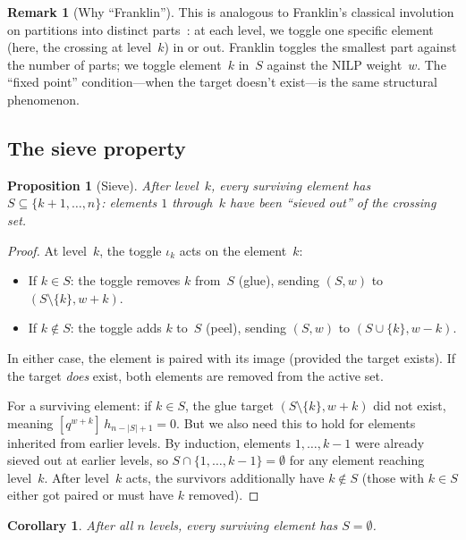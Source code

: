 \documentclass[11pt]{article}
\theoremstyle{plain}
\newtheorem{proposition}[theorem]{Proposition}
\newtheorem{corollary}[theorem]{Corollary}
\theoremstyle{definition}
\newtheorem{remark}[theorem]{Remark}
\begin{document}
\begin{remark}[Why ``Franklin'']
\label{rem:franklin}
This is analogous to Franklin's classical involution on
partitions into distinct parts~\cite{Andrews}: at each
level, we toggle one specific element (here, the crossing
at level~$k$) in or out.  Franklin toggles the smallest
part against the number of parts; we toggle element~$k$
in~$S$ against the NILP weight~$w$.  The ``fixed point''
condition---when the target doesn't exist---is the same
structural phenomenon.
\end{remark}


\subsection{The sieve property}

\begin{proposition}[Sieve]
\label{prop:sieve}
After level~$k$, every surviving element has
$S \subseteq \{k+1, \ldots, n\}$: elements $1$ through~$k$
have been ``sieved out'' of the crossing set.
\end{proposition}

\begin{proof}
At level~$k$, the toggle $\iota_k$ acts on the element~$k$:
\begin{itemize}
  \item If $k \in S$: the toggle removes $k$ from~$S$
    (glue), sending $(S, w)$ to $(S \setminus \{k\}, w+k)$.
  \item If $k \notin S$: the toggle adds $k$ to~$S$
    (peel), sending $(S, w)$ to $(S \cup \{k\}, w-k)$.
\end{itemize}
In either case, the element is paired with its image
(provided the target exists).  If the target
\emph{does} exist, both elements are removed from the
active set.

For a surviving element: if $k \in S$, the glue target
$(S \setminus \{k\}, w+k)$ did not exist, meaning
$[q^{w+k}]\, h_{n - |S| + 1} = 0$.  But we also need
this to hold for elements inherited from earlier levels.
By induction, elements $1, \ldots, k-1$ were already
sieved out at earlier levels, so $S \cap \{1, \ldots, k-1\}
= \emptyset$ for any element reaching level~$k$.  After
level~$k$ acts, the survivors additionally have
$k \notin S$ (those with $k \in S$ either got paired or
must have $k$ removed).
\end{proof}

\begin{corollary}
\label{cor:empty-S}
After all $n$ levels, every surviving element has
$S = \emptyset$.
\end{corollary}
\end{document}
